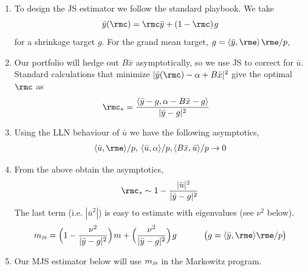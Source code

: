 \documentclass[12pt, leqno, letterpaper]{article}
\newcommand{\s}[1][1]{\hspace{#1pt}}
\newcommand{\ip}[2]{\langle #1, #2 \rangle}
\begin{document}
\begin{enumerate}
\item To design the JS estimator we follow the standard
playbook. We take
\[ \bar{y}(\rmc) = \rmc \bar{y}  + (1- \rmc) \s g \]
for a shrinkage target $g$. For the grand mean
target, $g = \ip{\bar{y}}{\rme}\s \rme /p$,
\item Our portfolio will hedge out $B \bar{x}$
asymptotically, so we use JS to correct for $\bar{u}$.
Standard calculations that minimize
$|\bar{y}(\rmc)-\alpha + B\bar{x}|^2$ give
the optimal $\rmc$ as
\begin{align}
 \rmc_*
&= \frac{\ip{\bar{y}-g}{\alpha - B \bar{x}-g}}{|\bar{y}-g|^2}
\end{align}
\item Using the LLN behaviour of $\bar{u}$ we have the following
asymptotics,
\begin{align}
\ip{\bar{u}}{\rme}/p, \s[2] \ip{\bar{u}}{\alpha}/p,
\ip{B\bar{x}}{\bar{u}}/p \to 0
\end{align}
\item From the above obtain the asymptotics,
\begin{align}
\rmc_* \sim 1 - \frac{|\bar{u}|^2}{|\bar{y}-g|^2}
\end{align}
The last term (i.e. $|\bar{u}^2|$) is easy to estimate
with eigenvalues (see $\nu^2$ below).
\[  m_{\textsc{js}} = \Big(1 - \frac{\nu^2}{|\bar{y}-g|^2} \Big)
\s  m 
+ \Big(\frac{\nu^2}{|\bar{y}-g|^2} \Big) \s g
\s[32]
\big( g = \ip{\bar{y}}{\rme} \rme / p \big) \]

\item Our MJS estimator below will use $m_\textsc{js}$
in the Markowitz program.

\newcommand{\js}{\ensuremath{\textsc{jsm}}}


\end{enumerate}
\end{document}
